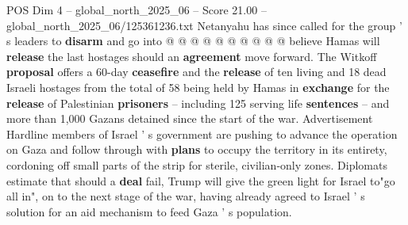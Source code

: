 \begin{textsample}{POS Dim 4 – global\_north\_2025\_06 – Score 21.00 – global\_north\_2025\_06/125361236.txt}
Netanyahu has since called for the group ' s leaders to \textbf{disarm} and go into @ @ @ @ @ @ @ @ @ @ believe Hamas will \textbf{release} the last hostages should an \textbf{agreement} move forward.
The Witkoff \textbf{proposal} offers a 60-day \textbf{ceasefire} and the \textbf{release} of ten living and 18 dead Israeli hostages from the total of 58 being held by Hamas in \textbf{exchange} for the \textbf{release} of Palestinian \textbf{prisoners} -- including 125 serving life \textbf{sentences} -- and more than 1,000 Gazans detained since the start of the war.
Advertisement Hardline members of Israel ' s government are pushing to advance the operation on Gaza and follow through with \textbf{plans} to occupy the territory in its entirety, cordoning off small parts of the strip for sterile, civilian-only zones.
Diplomats estimate that should a \textbf{deal} fail, Trump will give the green light for Israel to"go all in", on to the next stage of the war, having already agreed to Israel ' s solution for an aid mechanism to feed Gaza ' s population.

\end{textsample}
